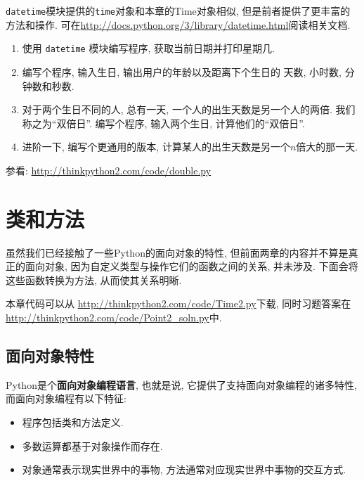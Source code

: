 \documentclass[10pt]{book}
\begin{document}
\begin{exercise}

{\tt datetime}模块提供的{\tt time}对象和本章的Time对象相似, 
但是前者提供了更丰富的方法和操作. 
可在\url{http://docs.python.org/3/library/datetime.html}阅读相关文档.

\begin{enumerate}

\item 使用 {\tt datetime} 模块编写程序, 获取当前日期并打印星期几. 

\item 编写个程序, 输入生日, 输出用户的年龄以及距离下个生日的
天数, 小时数, 分钟数和秒数. 

\item 对于两个生日不同的人, 
总有一天, 一个人的出生天数是另一个人的两倍. 
我们称之为``双倍日''.
编写个程序, 输入两个生日, 计算他们的``双倍日''.

\item 进阶一下, 编写个更通用的版本, 计算某人的出生天数是另一个$n$倍大的那一天. 

\end{enumerate}

参看: \url{http://thinkpython2.com/code/double.py}

\end{exercise}


\chapter{类和方法}

虽然我们已经接触了一些Python的面向对象的特性, 
但前面两章的内容并不算是真正的面向对象, 
因为自定义类型与操作它们的函数之间的关系, 并未涉及. 
下面会将这些函数转换为方法, 从而使其关系明晰. 

本章代码可以从
\url{http://thinkpython2.com/code/Time2.py}下载, 
同时习题答案在\url{http://thinkpython2.com/code/Point2_soln.py}中.


\section{面向对象特性}

Python是个{\bf 面向对象编程语言}, 
也就是说, 它提供了支持面向对象编程的诸多特性, 而面向对象编程有以下特征:

\begin{itemize}

\item 程序包括类和方法定义.

\item 多数运算都基于对象操作而存在. 

\item 对象通常表示现实世界中的事物, 方法通常对应现实世界中事物的交互方式. 

\end{itemize}
\end{document}
